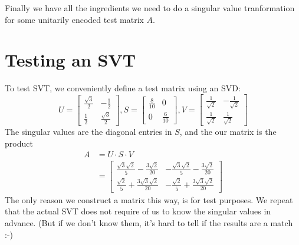 \documentclass{article}
\begin{document}
\noindent Finally we have all the ingredients we need to do a singular value tranformation for some unitarily encoded test matrix $A$.

%
%

\section*{Testing an SVT}

\noindent To test SVT, we conveniently define a test matrix using an SVD:
$$
    U = \begin{bmatrix} \frac{\sqrt{3}}{2} & -\frac{1}{2} \\ \frac{1}{2} & \frac{\sqrt{3}}{2} \end{bmatrix} ,
    S = \begin{bmatrix}  \frac{8}{10}         & 0    \\   0 & \frac{6}{10} \end{bmatrix} ,
    V = \begin{bmatrix} \frac{1}{\sqrt{2}} & -\frac{1}{\sqrt{2}} \\ \frac{1}{\sqrt{2}} & \frac{1}{\sqrt{2}}\end{bmatrix} 
$$
The singular values are the diagonal entries in $S$, and the our matrix is the product 
\begin{align*}
    A & = U \cdot S \cdot V  \\
       & =  \begin{bmatrix} \frac{\sqrt{3} \sqrt{2}}{5} - \frac{3 \sqrt{2}}{20} & -\frac{\sqrt{3} \sqrt{2}}{5} - \frac{3 \sqrt{2}}{20} \\
\frac{\sqrt{2}}{5} + \frac{3 \sqrt{3} \sqrt{2}}{20} & -\frac{\sqrt{2}}{5} + \frac{3 \sqrt{3} \sqrt{2}}{20}
\end{bmatrix}
\end{align*}
The only reason we construct a matrix this way, is for test purposes. We repeat that the actual SVT does not require of us to know the singular values in advance. (But if we don't know them, it's hard to tell if the results are a match :-)\\
\end{document}
